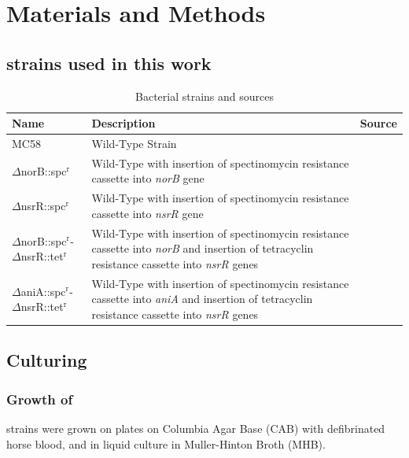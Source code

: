 \chapter{Materials and Methods}
\section{\Nsm\space strains used in this work}
\begin{table}[h]
\begin{center}
\begin{tabular}{>{\centering}m{4.4cm}m{6.4cm}>{\centering}m{3.1cm}}
\toprule
\textbf{Name} & \centering \textbf{Description} & \textbf{Source}
\tabularnewline
\midrule
MC58 & Wild-Type Strain & \citet{McGuinness1990}
\tabularnewline\noalign{\smallskip}\hline\noalign{\smallskip}
$\Delta$norB::spc$^\textrm{r}$\nomenclature{spc$^\textrm{r}$}{Spectinomycin resistance} & Wild-Type with insertion of spectinomycin resistance cassette into \textit{norB} gene & \citet{Heurlier2008}
\tabularnewline\noalign{\smallskip}\hline\noalign{\smallskip}
$\Delta$nsrR::spc$^\textrm{r}$ & Wild-Type with insertion of spectinomycin resistance cassette into \textit{nsrR} gene & \citet{Rock2007}
\tabularnewline\noalign{\smallskip}\hline\noalign{\smallskip}
$\Delta$norB::spc$^\textrm{r}$-$\Delta$nsrR::tet$^\textrm{r}$\nomenclature{tet$^\textrm{r}$}{Tetracyclin resistance} & Wild-Type with insertion of spectinomycin resistance cassette into \textit{norB} and insertion of tetracyclin resistance cassette into \textit{nsrR} genes & \citet{Heurlier2008}
\tabularnewline\noalign{\smallskip}\hline\noalign{\smallskip}
$\Delta$aniA::spc$^\textrm{r}$-$\Delta$nsrR::tet$^\textrm{r}$ & Wild-Type with insertion of spectinomycin resistance cassette into \textit{aniA} and insertion of tetracyclin resistance cassette into \textit{nsrR} genes & \citet{Heurlier2008}
\tabularnewline
\bottomrule
\end{tabular} 
\end{center}
\caption{Bacterial strains and sources
\label{tab:bacterial-strains}}
\end{table}

\section{Culturing \Nsm}
\subsection{Growth of \Nsm}
\Nm\space strains were grown on plates on Columbia Agar Base (CAB) with defibrinated horse blood, and in liquid culture in Muller-Hinton Broth (MHB).

